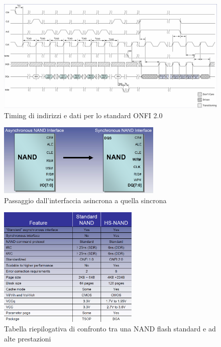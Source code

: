 \documentclass[11pt,4paper]{report}
\begin{document}
\begin{figure}[hbtp]
	\centering
	\includegraphics[width=\textwidth]{memorie/jc_onfi2_timing}
	\caption{Timing di indirizzi e dati per lo standard ONFI 2.0}
	\label{fig:jc_onfi2_timing}
\end{figure}

\begin{figure}[hbtp]
	\centering
	\includegraphics[width=0.7\textwidth]{memorie/jc_sync_async}
	\caption{Passaggio dall'interfaccia asincrona a quella sincrona}
	\label{fig:jc_sync_async}
\end{figure}

\begin{figure}[hbtp]
	\centering
	\includegraphics[width=0.6\textwidth]{memorie/jc_onfi2_table}
	\caption{Tabella riepilogativa di confronto tra una NAND flash standard e ad alte prestazioni}
	\label{fig:jc_onfi2_table}
\end{figure}
\end{document}
